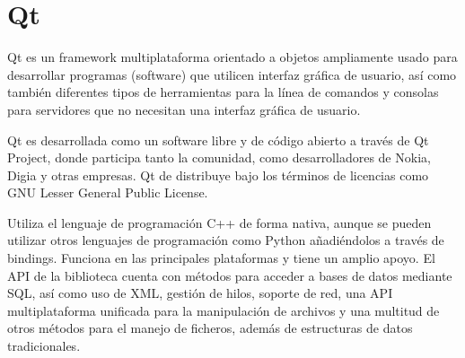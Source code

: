 \section{Qt}
\label{sec:plat_qt}

Qt\cite{qt} es un framework multiplataforma orientado a objetos ampliamente usado para desarrollar programas (software) que utilicen interfaz gráfica de usuario, así como también diferentes tipos de herramientas para la línea de comandos y consolas para servidores que no necesitan una interfaz gráfica de usuario.

Qt es desarrollada como un software libre y de código abierto a través de Qt Project, donde participa tanto la comunidad, como desarrolladores de Nokia, Digia y otras empresas. Qt de distribuye bajo los términos de licencias como GNU Lesser General Public License. 

Utiliza el lenguaje de programación C++ de forma nativa, aunque se pueden utilizar otros lenguajes de programación como Python añadiéndolos a través de bindings. Funciona en las principales plataformas y tiene un amplio apoyo. El API de la biblioteca cuenta con métodos para acceder a bases de datos mediante SQL, así como uso de XML, gestión de hilos, soporte de red, una API multiplataforma unificada para la manipulación de archivos y una multitud de otros métodos para el manejo de ficheros, además de estructuras de datos tradicionales.


















